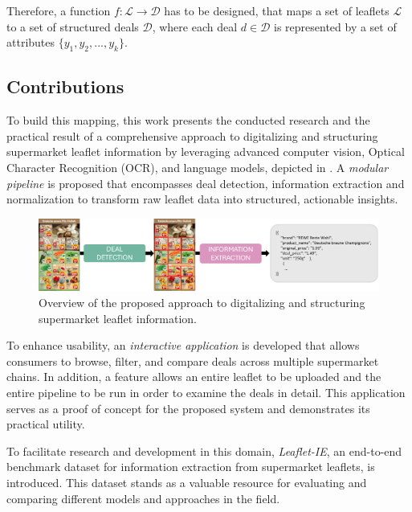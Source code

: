 \documentclass[11pt]{article}
\begin{document}
Therefore, a function $f: \mathcal{L} \to \mathcal{D}$ has to be designed, that maps a set of leaflets $\mathcal{L}$ to a set of structured deals $\mathcal{D}$, where each deal $d \in \mathcal{D}$ is represented by a set of attributes $\{y_1, y_2, ..., y_k\}$.


\subsection{Contributions}
To build this mapping, this work presents the conducted research and the practical result of a comprehensive approach to digitalizing and structuring supermarket leaflet information by leveraging advanced computer vision, Optical Character Recognition (OCR), and language models, depicted in . A \emph{modular pipeline} is proposed that encompasses deal detection, information extraction and normalization to transform raw leaflet data into structured, actionable insights.

\begin{figure}
    \centering
    \includegraphics[width=0.8\linewidth]{figures/overview.png}
    \caption{Overview of the proposed approach to digitalizing and structuring supermarket leaflet information.}
    \label{fig:overview}
\end{figure}

To enhance usability, an \emph{interactive application} is developed that allows consumers to browse, filter, and compare deals across multiple supermarket chains. In addition, a feature allows an entire leaflet to be uploaded and the entire pipeline to be run in order to examine the deals in detail. This application serves as a proof of concept for the proposed system and demonstrates its practical utility.

To facilitate research and development in this domain, \emph{Leaflet-IE}, an end-to-end benchmark dataset for information extraction from supermarket leaflets, is introduced. This dataset stands as a valuable resource for evaluating and comparing different models and approaches in the field.
\end{document}
